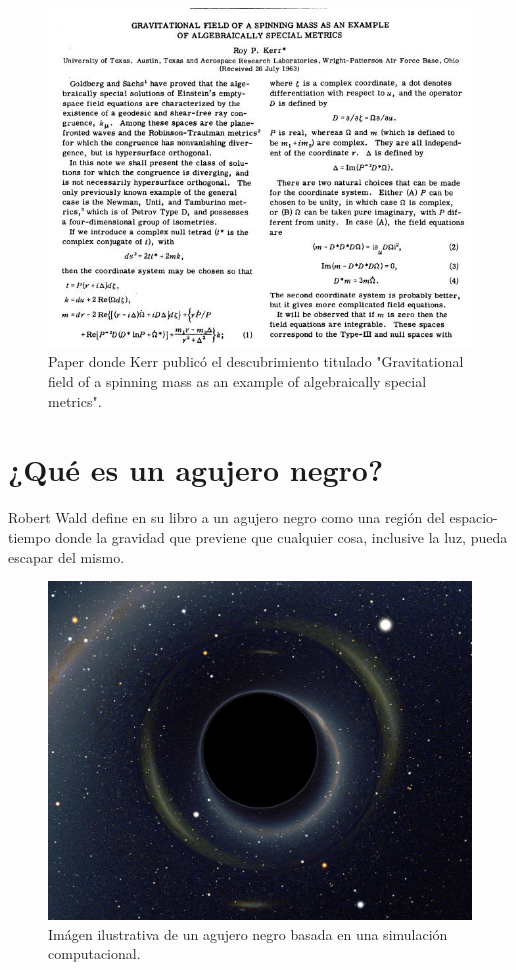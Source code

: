 \documentclass[12pt]{article}
\theoremstyle{plain}
\begin{document}
\begin{figure}[H]
\centering
\includegraphics[width=\textwidth]{paper_original.jpeg}
\caption{Paper donde Kerr publicó el descubrimiento titulado "Gravitational field of a spinning mass as an example of algebraically special metrics".}
\label{paper_foto}
\end{figure}

\section{¿Qué es un agujero negro?}
Robert Wald define en su libro \cite{wald} a un agujero negro como una región del espacio-tiempo donde la gravidad que previene que cualquier cosa, inclusive la luz, pueda escapar del mismo. 

\begin{figure}[H]
\centering
\includegraphics[scale=0.5]{Black_Hole.jpg}
\caption{Imágen ilustrativa de un agujero negro basada en una simulación computacional.}
\label{bh}
\end{figure}
\end{document}
